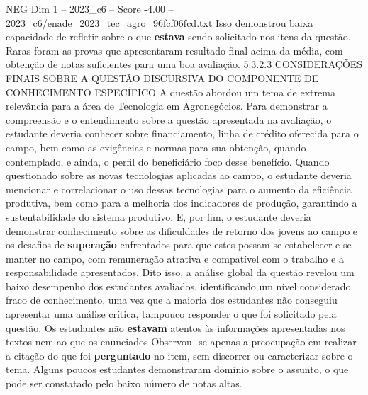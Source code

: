 \begin{textsample}{NEG Dim 1 – 2023\_c6 – Score -4.00 – 2023\_c6/enade\_2023\_tec\_agro\_96fcf06fcd.txt}
Isso demonstrou baixa capacidade de refletir sobre o que \textbf{estava} sendo solicitado nos itens da questão.
Raras foram as provas que apresentaram resultado final acima da média, com obtenção de notas suficientes para uma boa avaliação. 5.3.2.3 CONSIDERAÇÕES FINAIS SOBRE A QUESTÃO DISCURSIVA DO COMPONENTE DE CONHECIMENTO ESPECÍFICO A questão abordou um tema de extrema relevância para a área de Tecnologia em Agronegócios.
Para demonstrar a compreensão e o entendimento sobre a questão apresentada na avaliação, o estudante deveria conhecer sobre financiamento, linha de crédito oferecida para o campo, bem como as exigências e normas para sua obtenção, quando contemplado, e ainda, o perfil do beneficiário foco desse benefício.
Quando questionado sobre as novas tecnologias aplicadas ao campo, o estudante deveria mencionar e correlacionar o uso dessas tecnologias para o aumento da eficiência produtiva, bem como para a melhoria dos indicadores de produção, garantindo a sustentabilidade do sistema produtivo.
E, por fim, o estudante deveria demonstrar conhecimento sobre as dificuldades de retorno dos jovens ao campo e os desafios de \textbf{superação} enfrentados para que estes possam se estabelecer e se manter no campo, com remuneração atrativa e compatível com o trabalho e a responsabilidade apresentados.
Dito isso, a análise global da questão revelou um baixo desempenho dos estudantes avaliados, identificando um nível considerado fraco de conhecimento, uma vez que a maioria dos estudantes não conseguiu apresentar uma análise crítica, tampouco responder o que foi solicitado pela questão.
Os estudantes não \textbf{estavam} atentos às informações apresentadas nos textos nem ao que os enunciados Observou -se apenas a preocupação em realizar a citação do que foi \textbf{perguntado} no item, sem discorrer ou caracterizar sobre o tema.
Alguns poucos estudantes demonstraram domínio sobre o assunto, o que pode ser constatado pelo baixo número de notas altas.

\end{textsample}
